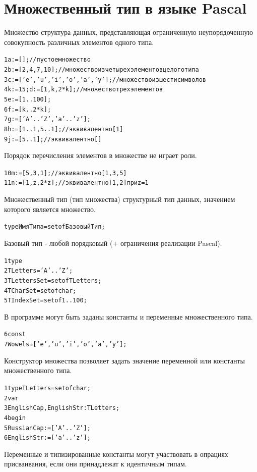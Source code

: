 \documentclass{beamer}
\begin{document}
\section{Множественный тип в языке Pascal}
\begin{frame}[fragile]
\begin{block}{Множество}
структура данных, представляющая ограниченную неупорядоченную совокупность различных элементов одного типа.
\end{block}
\begin{alltt}
1  a := []; //пустое множество
2  b := [2, 4, 7, 10]; //множество из четырех элементов целого типа
3  с := ['e', 'u', 'i', 'o', 'a', 'y']; //множество из шести символов
4  k := 15; d := [1, k, 2*k]; //множество трех элементов
5  e := [1..100];
6  f := [k..2*k];
7  g := ['A'..'Z', 'a'..'z'];
8  h := [1..1, 5..1]; //эквивалентно [1]
9  j := [5..1];//эквивалентно []
\end{alltt}
Порядок перечисления элементов в множестве не играет роли.
\begin{alltt}
10  m := [5, 3, 1]; //эквивалентно [1, 3, 5]
11  n := [1, z, 2*z]; //эквивалентно [1, 2] при z = 1
\end{alltt}
\end{frame}

\begin{frame}[fragile]
\begin{block}{Множественный тип (тип множества)}
структурный тип данных, значением которого является множество.
\end{block}
\begin{alltt}
  type ИмяТипа = set of БазовыйТип;
\end{alltt}
Базовый тип - любой порядковый (+ ограничения реализации Pascal).
\begin{alltt}
1  type 
2     TLetters = 'A'..'Z';
3     TLettersSet = set of TLetters;
4     TCharSet = set of char;  
5     TIndexSet = set of 1..100;
\end{alltt}
В программе могут быть заданы константы и переменные множественного типа.
\begin{alltt}
6  const 
7     Wowels = ['e', 'u', 'i', 'o', 'a', 'y'];
\end{alltt}
\end{frame}
   
\begin{frame}[fragile]
\begin{block}{Конструктор множества}
позволяет задать значение переменной или константы множественного типа.
\end{block}
\begin{alltt}
1  type TLetters = set of char;
2  var
3     EnglishCap, EnglishStr: TLetters;
4  begin
5     RussianCap := ['A'..'Z'];
6     EnglishStr := ['a'..'z'];
\end{alltt}
Переменные и типизированные константы могут участвовать в опрациях присваивания, если они 
принадлежат к идентичным типам.
\end{frame}  
\end{document}
